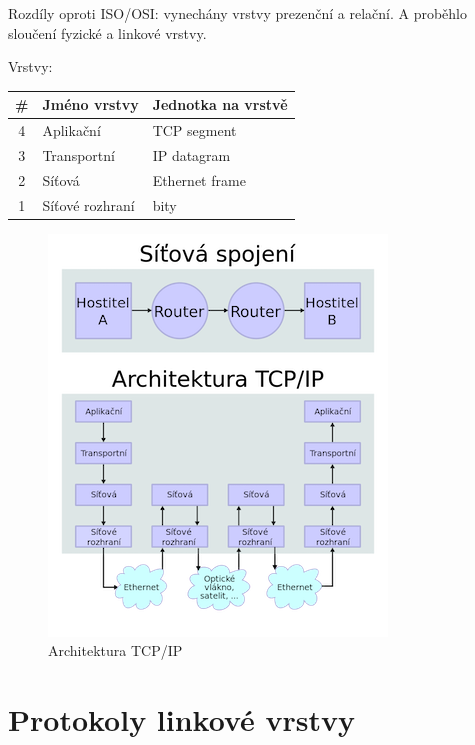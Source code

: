 \documentclass{szzclass}
\begin{document}
Rozdíly oproti ISO/OSI: vynechány vrstvy prezenční a relační. A proběhlo
sloučení fyzické a linkové vrstvy.

Vrstvy:

\begin{longtable}[]{@{}cll@{}}
\toprule
\# & Jméno vrstvy & Jednotka na vrstvě\tabularnewline
\midrule
\endhead
4 & Aplikační & TCP segment\tabularnewline
3 & Transportní & IP datagram\tabularnewline
2 & Síťová & Ethernet frame\tabularnewline
1 & Síťové rozhraní & bity\tabularnewline
\bottomrule
\end{longtable}

\begin{figure}[h]
\centering
\includegraphics[width=\textwidth]{topics/bi-spol-23/images/TCP-IP-Architektura.png}
\caption{Architektura TCP/IP}
\end{figure}

\hypertarget{protokoly-linkovuxe9-vrstvy}{%
\section{Protokoly linkové
vrstvy}\label{protokoly-linkovuxe9-vrstvy}}
\end{document}
